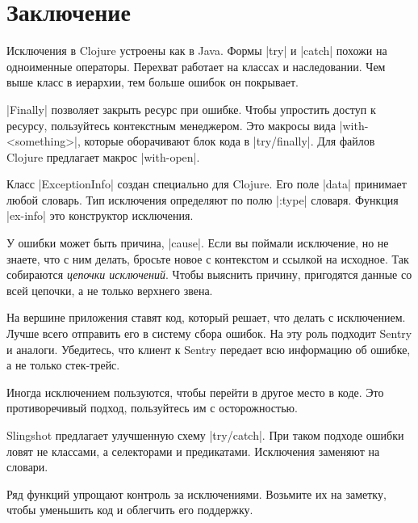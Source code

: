 \section{Заключение}

Исключения в Clojure устроены как в Java. Формы \spverb|try| и \spverb|catch|
похожи на одноименные операторы. Перехват работает на классах и
наследовании. Чем выше класс в иерархии, тем больше ошибок он покрывает.

\spverb|Finally| позволяет закрыть ресурс при ошибке. Чтобы упростить доступ к
ресурсу, пользуйтесь контекстным менеджером. Это макросы вида
\spverb|with-<something>|, которые оборачивают блок кода в
\spverb|try/finally|. Для файлов Clojure предлагает макрос \spverb|with-open|.

Класс \spverb|ExceptionInfo| создан специально для Clojure. Его поле
\spverb|data| принимает любой словарь. Тип исключения определяют по полю
\spverb|:type| словаря. Функция \spverb|ex-info| это конструктор исключения.

У ошибки может быть причина, \spverb|cause|. Если вы поймали исключение, но не
знаете, что с ним делать, бросьте новое с контекстом и ссылкой на исходное. Так
собираются \emph{цепочки исключений}. Чтобы выяснить причину, пригодятся данные
со всей цепочки, а не только верхнего звена.

На вершине приложения ставят код, который решает, что делать с
исключением. Лучше всего отправить его в систему сбора ошибок. На эту роль
подходит Sentry и аналоги. Убедитесь, что клиент к Sentry передает всю
информацию об ошибке, а не только стек-трейс.

Иногда исключением пользуются, чтобы перейти в другое место в коде. Это
противоречивый подход, пользуйтесь им с осторожностью.

Slingshot предлагает улучшенную схему \spverb|try/catch|. При таком подходе
ошибки ловят не классами, а селекторами и предикатами. Исключения заменяют на
словари.

Ряд функций упрощают контроль за исключениями. Возьмите их на заметку, чтобы
уменьшить код и облегчить его поддержку.
